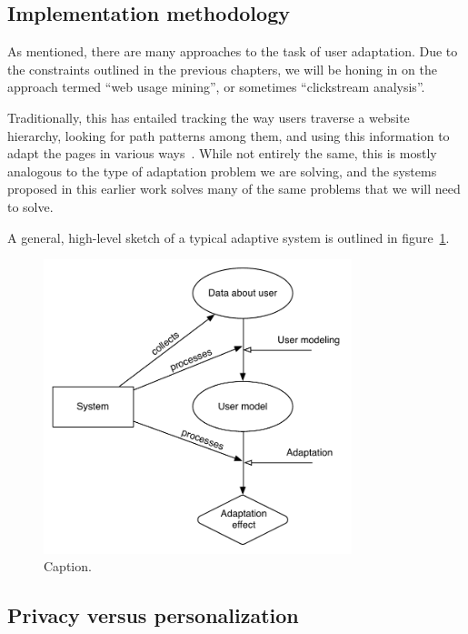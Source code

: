 \subsection{Implementation methodology}

As mentioned, there are many approaches to the task of user adaptation. Due to the constraints outlined in the previous chapters, we will be honing in on the approach termed ``web usage mining'', or sometimes ``clickstream analysis''.

Traditionally, this has entailed tracking the way users traverse a website hierarchy, looking for path patterns among them, and using this information to adapt the pages in various ways~\cite{Mobasher2000,Eirinaki2003,Montgomery2009}. While not entirely the same, this is mostly analogous to the type of adaptation problem we are solving, and the systems proposed in this earlier work solves many of the same problems that we will need to solve.

A general, high-level sketch of a typical adaptive system is outlined in figure~\ref{fig:general_adaptive_system}.

\begin{figure}[h]
  \centering
    \includegraphics[width=0.8\textwidth]{Figures/adaptation-high-level}
  \caption{Caption.}
  \label{fig:general_adaptive_system}
\end{figure}

\subsection{Privacy versus personalization}
\label{survey:sec:privacy_vs_personalization}



